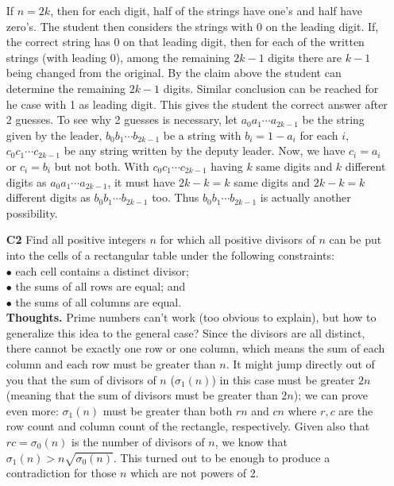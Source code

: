 \documentclass[11pt,a4paper]{article}
\begin{document}
\begin{itemize}
If $n=2k$, then for each digit, half of the strings have one's and half have zero's. 
The student then considers the strings with 0 on the leading digit. 
If, the correct string has 0 on that leading digit, then for each of the written strings (with leading 0), among the remaining $2k-1$ digits there are $k-1$ being changed from the original. By the claim above the student can determine the remaining $2k-1$ digits. 
Similar conclusion can be reached for he case with 1 as leading digit. 
This gives the student the correct answer after 2 guesses. 
To see why 2 guesses is necessary, let $a_0a_1\cdots a_{2k-1}$ be the string given by the leader, $b_0b_1\cdots b_{2k-1}$ be a string with $b_i=1-a_i$ for each $i$, $c_0c_1\cdots c_{2k-1}$ be any string written by the deputy leader. 
Now, we have $c_i=a_i$ or $c_i=b_i$ but not both. 
With $c_0c_1\cdots c_{2k-1}$ having $k$ same digits and $k$ different digits as $a_0a_1\cdots a_{2k-1}$, 
it must have $2k-k=k$ same digits and $2k-k=k$ different digits as $b_0b_1\cdots b_{2k-1}$ too. 
Thus $b_0b_1\cdots b_{2k-1}$ is actually another possibility. 

\newpage
\item[\textbf{C2}]
Find all positive integers $n$ for which all positive divisors of $n$ can be put into the cells of a rectangular table under the following constraints:\\
$\bullet$ each cell contains a distinct divisor;\\
$\bullet$ the sums of all rows are equal; and\\
$\bullet$ the sums of all columns are equal.\\

\textbf{Thoughts.} 
Prime numbers can't work (too obvious to explain), but how to generalize this idea to the general case? 
Since the divisors are all distinct, there cannot be exactly one row or one column, which means the sum of each column and each row must be greater than $n$. 
It might jump directly out of you that the sum of divisors of $n$ ($\sigma_1(n)$) in this case must be greater $2n$ (meaning that the sum of divisors must be greater than $2n$); we can prove even more: $\sigma_1(n)$ must be greater than both $rn$ and $cn$ where $r, c$ are the row count and column count of the rectangle, respectively. 
Given also that $rc=\sigma_0(n)$ is the number of divisors of $n$, we know that $\sigma_1(n)>n\sqrt{\sigma_0(n)}$. 
This turned out to be enough to produce a contradiction for those $n$ which are not powers of 2. 


\end{itemize}
\end{document}
